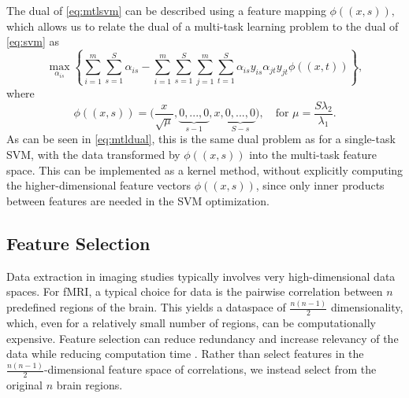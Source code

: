 \documentclass{llncs}
\begin{document}
The dual of \eqref{eq:mtlsvm} can be described using a feature mapping
$\phi((x,s)),$ which allows us to relate the dual of a multi-task learning
problem to the dual of \eqref{eq:svm} as
\begin{equation}
\label{eq:mtldual}
\max_{\alpha_{is}}  \left\{ \sum_{i=1}^m\sum_{s=1}^S \alpha_{is} -  \sum_{i=1}^m\sum_{s=1}^S\sum_{j=1}^m\sum_{t=1}^S  \alpha_{is}y_{is}\alpha_{jt}y_{jt}\phi((x,t))      \right\},
\end{equation}
where
\begin{equation}
\phi((x,s)) = \Big(\frac{x}{\sqrt{\mu}}, \underbrace{0,...,0}_{s-1}, x,
\underbrace{0,...,0}_{S-s} \Big), \quad \text{for  } \mu = \frac{S \lambda_2}{\lambda_1} .
\end{equation}
As can be seen in \eqref{eq:mtldual}, this is the same dual problem as for a
single-task SVM, with the data transformed by $\phi((x,s))$ into the multi-task
feature space. This can be implemented as a kernel method, without explicitly
computing the higher-dimensional feature vectors $\phi((x,s))$, since only inner
products between features are needed in the SVM optimization.




\subsection{Feature Selection}
\label{subsec:FS}
Data extraction in imaging studies typically involves very high-dimensional data
spaces.  For fMRI, a typical choice for data is the pairwise correlation between
$n$ predefined regions of the brain.  This yields a dataspace of
$\frac{n(n-1)}{2}$ dimensionality, which, even for a relatively small number of
regions, can be computationally expensive.  Feature selection can reduce
redundancy and increase relevancy of the data while reducing computation time
\cite{featsel}. Rather than select features in the
$\frac{n(n-1)}{2}$-dimensional feature space of correlations, we instead select
from the original $n$ brain regions.
\end{document}
